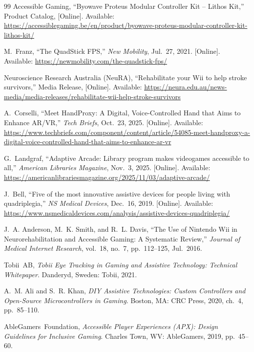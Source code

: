 \documentclass[twoside, a4paper, 11pt]{article}
\begin{document}
\begin{thebibliography}{99}
Accessible Gaming, ``Byowave Proteus Modular Controller Kit -- Lithos Kit,'' Product Catalog, [Online]. Available: \url{https://accessiblegaming.be/en/product/byowave-proteus-modular-controller-kit-lithos-kit/}

M.~Franz, ``The QuadStick FPS,'' \emph{New Mobility}, Jul.~27, 2021. [Online]. Available: \url{https://newmobility.com/the-quadstick-fps/}

Neuroscience Research Australia (NeuRA), ``Rehabilitate your Wii to help stroke survivors,'' Media Release, [Online]. Available: \url{https://neura.edu.au/news-media/media-releases/rehabilitate-wii-help-stroke-survivors}

A.~Corselli, ``Meet HandProxy: A Digital, Voice-Controlled Hand that Aims to Enhance AR/VR,'' \emph{Tech Briefs}, Oct.~23, 2025. [Online]. Available: \url{https://www.techbriefs.com/component/content/article/54085-meet-handproxy-a-digital-voice-controlled-hand-that-aims-to-enhance-ar-vr}

G.~Landgraf, ``Adaptive Arcade: Library program makes videogames accessible to all,'' \emph{American Libraries Magazine}, Nov.~3, 2025. [Online]. Available: \url{https://americanlibrariesmagazine.org/2025/11/03/adaptive-arcade/}

J.~Bell, ``Five of the most innovative assistive devices for people living with quadriplegia,'' \emph{NS Medical Devices}, Dec.~16, 2019. [Online]. Available: \url{https://www.nsmedicaldevices.com/analysis/assistive-devices-quadriplegia/}

J.~A. Anderson, M.~K. Smith, and R.~L. Davis, ``The Use of Nintendo Wii in Neurorehabilitation and Accessible Gaming: A Systematic Review,'' \emph{Journal of Medical Internet Research}, vol.~18, no.~7, pp.~112--125, Jul.~2016.

Tobii~AB, \emph{Tobii Eye Tracking in Gaming and Assistive Technology: Technical Whitepaper}. Danderyd, Sweden: Tobii, 2021.

A.~M. Ali and S.~R. Khan, \emph{DIY Assistive Technologies: Custom Controllers and Open-Source Microcontrollers in Gaming}. Boston, MA: CRC Press, 2020, ch.~4, pp.~85--110.

AbleGamers~Foundation, \emph{Accessible Player Experiences (APX): Design Guidelines for Inclusive Gaming}. Charles Town, WV: AbleGamers, 2019, pp.~45--60.


\end{thebibliography}
\end{document}
